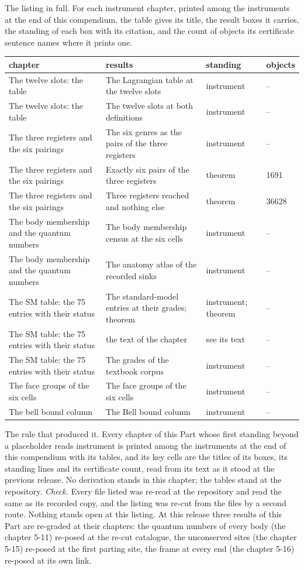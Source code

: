 \begin{chproof}[instrument]
The listing in full. For each instrument chapter, printed among the instruments at the end of this compendium, the table gives its title, the result boxes it carries, the standing of each box with its citation, and the count of objects its certificate sentence names where it prints one.
{\small
\begin{longtable}{p{38mm}p{63mm}p{30mm}p{14mm}}
\hline
chapter & results & standing & objects \\
\hline
\endhead
The twelve slots: the table & The Lagrangian table at the twelve slots & instrument & -- \\
The twelve slots: the table & The twelve slots at both definitions & instrument & -- \\
The three registers and the six pairings & The six genres as the pairs of the three registers & instrument & -- \\
The three registers and the six pairings & Exactly six pairs of the three registers & theorem & 1691 \\
The three registers and the six pairings & Three registers reached and nothing else & theorem & 36628 \\
The body membership and the quantum numbers & The body membership census at the six cells & instrument & -- \\
The body membership and the quantum numbers & The anatomy atlas of the recorded sinks & instrument & -- \\
The SM table: the 75 entries with their status & The standard-model entries at their grades; theorem & instrument; theorem & -- \\
The SM table: the 75 entries with their status & the text of the chapter & see its text & -- \\
The SM table: the 75 entries with their status & The grades of the textbook corpus & instrument & -- \\
The face groups of the six cells & The face groups of the six cells & instrument & -- \\
The bell bound column & The Bell bound column & instrument & -- \\
\hline
\end{longtable}
}
The rule that produced it. Every chapter of this Part whose first standing beyond a placeholder reads instrument is printed among the instruments at the end of this compendium with its tables, and its key cells are the titles of its boxes, its standing lines and its certificate count, read from its text as it stood at the previous release.
No derivation stands in this chapter; the tables stand at the repository.
\emph{Check.} Every file listed was re-read at the repository and read the same as its recorded copy, and the listing was re-cut from the files by a second route.
Nothing stands open at this listing. At this release three results of this Part are re-graded at their chapters: the quantum numbers of every body (the chapter 5-11) re-posed at the re-cut catalogue, the unconserved sites (the chapter 5-15) re-posed at the first parting site, the frame at every end (the chapter 5-16) re-posed at its own link.
\end{chproof}
\label{chend:V-L-the-instrument-tables-at-the-repository}
